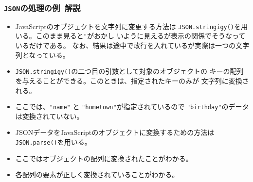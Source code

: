 \begin{frame}[containsverbatim]
\frametitle{\protect\texttt{JSON}の処理の例--解説}
\begin{itemize}
 \item JavaScriptのオブジェクトを文字列に変更する方法は
       \texttt{JSON.stringigy()}を用いる。このまま見ると\Verb+"+がおかし
       いように見えるが表示の関係でそうなっているだけである。%
なお、結果は途中で改行を入れているが実際は一つの文字列となっている。
 \item \texttt{JSON.stringigy()}の二つ目の引数として対象のオブジェクトの
       キーの配列を与えることができる。このときは、指定されたキーのみが
       文字列に変換される。
 \item ここでは、\Verb+"name"+ と \Verb+"hometown"+が指定されているので
\Verb+"birthday"+のデータは変換されていない。
 \item JSONデータをJavaScriptのオブジェクトに変換するための方法は
       \texttt{JSON.parse()}を用いる。
 \item ここではオブジェクトの配列に変換されたことがわかる。
 \item 各配列の要素が正しく変換されていることがわかる。
\end{itemize}
\end{frame}


